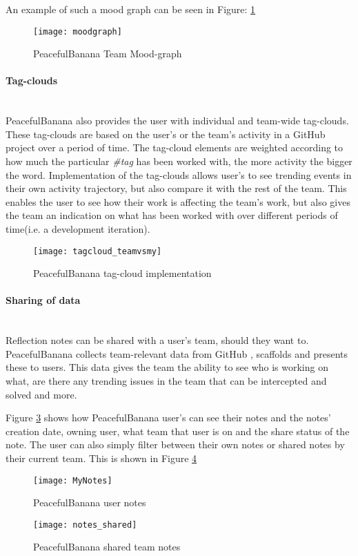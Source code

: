 An example of such a mood graph can be seen in Figure: \ref{moodgraphfunc}
\begin{figure}[H]
    \centering
        \texttt{[image: moodgraph]}
    \caption{PeacefulBanana Team Mood-graph}
    \label{moodgraphfunc}
\end{figure}
\paragraph{Tag-clouds}\mbox{}\\
PeacefulBanana also provides the user with individual and team-wide tag-clouds. These tag-clouds are based on the user's or the team's activity in a GitHub project over a period of time. The tag-cloud elements are weighted according to how much the particular \emph{\#tag} has been worked with, the more activity the bigger the word. Implementation of the tag-clouds allows user's to see trending events in their own activity trajectory, but also compare it with the rest of the team. This enables the user to see how their work is affecting the team's work, but also gives the team an indication on what has been worked with over different periods of time(i.e. a development iteration). 
\begin{figure}[H]
    \centering
        \texttt{[image: tagcloud\_teamvsmy]}
    \caption{PeacefulBanana tag-cloud implementation}
    \label{tagcloud_teamvsmy}
\end{figure}
\paragraph{Sharing of data}\mbox{}\\
Reflection notes can be shared with a user's team, should they want to.  PeacefulBanana collects team-relevant data from GitHub , scaffolds and presents these to users. This data gives the team the ability to see who is working on what, are there any trending issues in the team that can be intercepted and solved and more.  

Figure \ref{MyNotesFunc} shows how PeacefulBanana user's can see their notes and the notes' creation date, owning user, what team that user is on and the share status of the note. The user can also simply filter between their own notes or shared notes by their current team. This is shown in Figure \ref{notes_sharedfunc}
\begin{figure}[H]
    \centering
        \texttt{[image: MyNotes]}
    \caption{PeacefulBanana user notes}
    \label{MyNotesFunc}
\end{figure}
\begin{figure}[H]
    \centering
        \texttt{[image: notes\_shared]}
    \caption{PeacefulBanana shared team notes}
    \label{notes_sharedfunc}
\end{figure}

